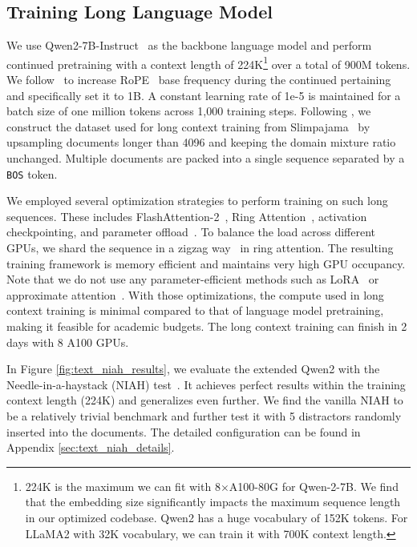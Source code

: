 \subsection{Training Long Language Model}
\label{sec:long-lm-training}
We use Qwen2-7B-Instruct~\citep{qwen2} as the backbone language model and perform continued pretraining with a context length of 224K\footnote{224K is the maximum we can fit with 8$\times$A100-80G for Qwen-2-7B. We find that the embedding size significantly impacts the maximum sequence length in our optimized codebase. Qwen2 has a huge vocabulary of 152K tokens. For LLaMA2 with 32K vocabulary, we can train it with 700K context length.} over a total of 900M tokens. We follow~\cite{xiong2023effective} to increase RoPE~\citep{su2023roformer}  base frequency during the continued pertaining and specifically set it to 1B. A constant learning rate of 1e-5 is maintained for a batch size of one million tokens across 1,000 training steps. Following \cite{fu2024data}, we construct the dataset used for long context training from Slimpajama~\citep{slimpajama} by upsampling documents longer than 4096 and keeping the domain mixture ratio unchanged. Multiple documents are packed into a single sequence separated by a \texttt{BOS} token.

 We employed several optimization strategies to perform training on such long sequences. These includes FlashAttention-2~\citep{dao2023flashattention2}, Ring Attention~\cite{liu2023ring, li-etal-2023-sequence}, activation checkpointing, and parameter offload~\cite{rajbhandari2020zero}. To balance the load across different GPUs, we shard the sequence in a zigzag way~\cite{zigzagringattn} in ring attention. The resulting training framework is memory efficient and maintains very high GPU occupancy.  Note that we do not use any parameter-efficient methods such as LoRA~\citep{hu2021lora} or approximate attention~\citep{child2019generating}. With those optimizations, the compute used in long context training is minimal compared to that of language model pretraining, making it feasible for academic budgets. The long context training can finish in 2 days with 8 A100 GPUs.

In Figure \ref{fig:text_niah_results}, we evaluate the extended Qwen2 with the Needle-in-a-haystack (NIAH) test~\citep{arizeniah, niah}. It achieves perfect results within the training context length (224K) and generalizes even further. We find the vanilla NIAH to be a relatively trivial benchmark and further test it with 5 distractors randomly inserted into the documents. The detailed configuration can be found in Appendix \ref{sec:text_niah_details}.

